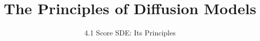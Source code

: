 ﻿%

\graphicspath{{../images/}}
\title{The Principles of Diffusion Models}
\subtitle{4.1 Score SDE: Its Principles}


\begin{frame}
    \titlepage
\end{frame}


